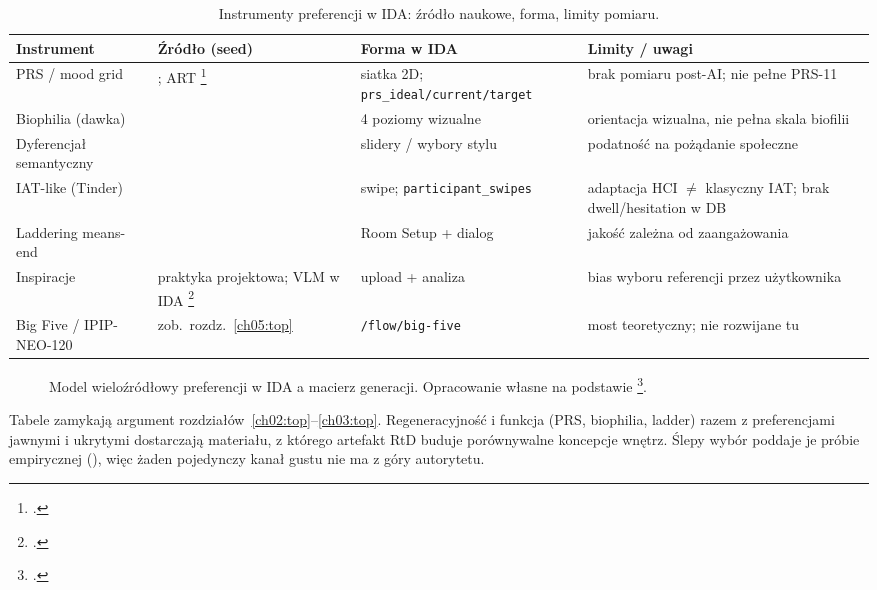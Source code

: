 \begin{table}[htbp]
  \centering
  \caption{Instrumenty preferencji w IDA: źródło naukowe, forma, limity pomiaru.}
  \label{tab:ch03:instruments}
  \begin{tabular}{@{}p{}p{}p{}p{}@{}}
    \toprule
    Instrument & Źródło (seed) & Forma w IDA & Limity / uwagi \\
    \midrule
    PRS / mood grid
      & \textcite{hartig1997prs}; ART \footcite{kaplan1995restorative}
      & siatka 2D; \texttt{prs\_ideal/current/target}
      & brak pomiaru post-AI; nie pełne PRS-11 \\
    Biophilia (dawka)
      & \textcite{kellert2008biophilic}
      & 4 poziomy wizualne
      & orientacja wizualna, nie pełna skala biofilii \\
    Dyferencjał semantyczny
      & \textcite{osgood1957measurement}
      & slidery / wybory stylu
      & podatność na pożądanie społeczne \\
    IAT-like (Tinder)
      & \textcite{greenwald1998iat}
      & swipe; \texttt{participant\_swipes}
      & adaptacja HCI $\neq$ klasyczny IAT; brak dwell/hesitation w DB \\
    Laddering means-end
      & \textcite{reynolds1988laddering}
      & Room Setup + dialog
      & jakość zależna od zaangażowania \\
    Inspiracje
      & praktyka projektowa; VLM w IDA \footcite{idaPlatform2026}
      & upload + analiza
      & bias wyboru referencji przez użytkownika \\
    Big Five / IPIP-NEO-120
      & zob.\ rozdz.~\ref{ch05:top}
      & \texttt{/flow/big-five}
      & most teoretyczny; nie rozwijane tu \\
    \bottomrule
  \end{tabular}
\end{table}

\begin{figure}[htbp]
  \centering
  \caption[Model wieloźródłowy preferencji w IDA a macierz generacji. Opracowanie własne na podstawie artefaktu IDA.]{Model wieloźródłowy preferencji w IDA a macierz generacji.
    Opracowanie własne na podstawie \footcite{idaPlatform2026}.}
  \label{fig:ch03:multisource}
\end{figure}

Tabele zamykają argument rozdziałów~\ref{ch02:top}--\ref{ch03:top}. Regeneracyjność i funkcja (PRS, biophilia, ladder) razem z preferencjami jawnymi i ukrytymi dostarczają materiału, z którego artefakt RtD buduje porównywalne koncepcje wnętrz. Ślepy wybór poddaje je próbie empirycznej (), więc żaden pojedynczy kanał gustu nie ma z góry autorytetu.
